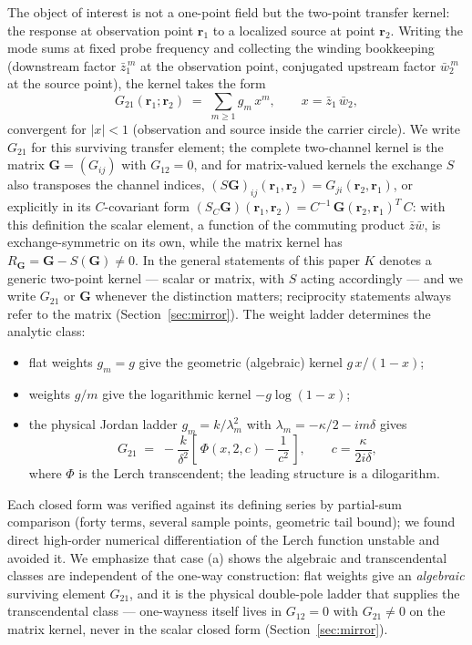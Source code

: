 \documentclass[11pt,a4paper]{article}
\newcommand{\zb}{\bar{z}}
\newcommand{\wb}{\bar{w}}
\newcommand{\zbone}{\bar{z}_1}
\newcommand{\wbtwo}{\bar{w}_2}
\begin{document}
The object of interest is not a one-point field but the two-point transfer
kernel: the response at observation point $\mathbf{r}_1$ to a localized source at
point $\mathbf{r}_2$. Writing the mode sums at fixed probe frequency and
collecting the winding bookkeeping (downstream factor $\zbone^{\,m}$ at the
observation point, conjugated upstream factor $\wbtwo^{\,m}$ at the source
point), the kernel takes the form
\begin{equation}
G_{21}(\mathbf{r}_1;\mathbf{r}_2) \;=\; \sum_{m \geq 1} g_m\, x^m,
\qquad x = \zbone\,\wbtwo,
\label{eq:kernelsum}
\end{equation}
convergent for $|x| < 1$ (observation and source inside the carrier circle).
We write $G_{21}$ for this surviving transfer element; the complete
two-channel kernel is the matrix $\mathbf{G} = (G_{ij})$ with $G_{12} = 0$,
and for matrix-valued kernels the exchange $S$ also transposes the channel
indices,
$(S \mathbf{G})_{ij}(\mathbf{r}_1, \mathbf{r}_2) = G_{ji}(\mathbf{r}_2,
\mathbf{r}_1)$, or explicitly in its $C$-covariant form
$(S_C \mathbf{G})(\mathbf{r}_1, \mathbf{r}_2) = C^{-1}\,
\mathbf{G}(\mathbf{r}_2, \mathbf{r}_1)^{T}\, C$: with this definition the
scalar element, a function of the commuting product $\zb\wb$, is
exchange-symmetric on its own, while the matrix kernel has
$R_{\mathbf{G}} = \mathbf{G} - S(\mathbf{G}) \neq 0$. In the general
statements of this paper $K$ denotes a generic two-point kernel --- scalar or
matrix, with $S$ acting accordingly --- and we write $G_{21}$ or $\mathbf{G}$
whenever the distinction matters; reciprocity statements always refer to the
matrix (Section~\ref{sec:mirror}). The
weight ladder determines the analytic class:
\begin{itemize}
\item[(a)] flat weights $g_m = g$ give the geometric (algebraic) kernel
  $g\,x/(1 - x)$;
\item[(b)] weights $g/m$ give the logarithmic kernel $-g \log(1 - x)$;
\item[(c)] the physical Jordan ladder $g_m = k / \lambda_m^2$ with
  $\lambda_m = -\kappa/2 - i m \delta$ gives
  \begin{equation}
  G_{21} \;=\; -\frac{k}{\delta^{2}} \left[\, \Phi(x, 2, c) - \frac{1}{c^{2}} \,\right],
  \qquad c = \frac{\kappa}{2 i \delta},
  \label{eq:lerch}
  \end{equation}
  where $\Phi$ is the Lerch transcendent; the leading structure is a
  dilogarithm.
\end{itemize}
Each closed form was verified against its defining series by partial-sum
comparison (forty terms, several sample points, geometric tail bound); we found
direct high-order numerical differentiation of the Lerch function unstable and
avoided it. We emphasize that case (a) shows the algebraic and
transcendental classes are independent of the one-way construction: flat
weights give an \emph{algebraic} surviving element $G_{21}$, and it is the
physical double-pole ladder that supplies the transcendental class ---
one-wayness itself lives in $G_{12} = 0$ with $G_{21} \neq 0$ on the
matrix kernel, never in the
scalar closed form (Section~\ref{sec:mirror}).
\end{document}
